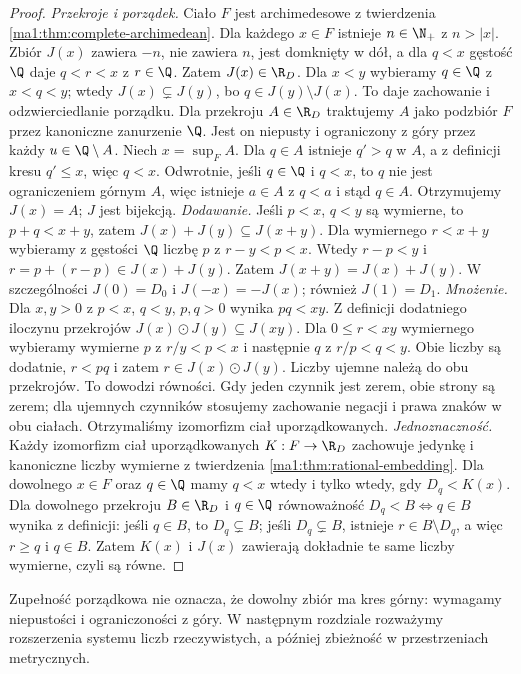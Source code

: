 \begin{proof}
\emph{Przekroje i porządek.} Ciało $F$ jest archimedesowe z twierdzenia \ref{ma1:thm:complete-archimedean}. Dla każdego $x\in F$ istnieje $n\in\N_+$ z $n>|x|$. Zbiór $J(x)$ zawiera $-n$, nie zawiera $n$, jest domknięty w dół, a dla $q<x$ gęstość $\Q$ daje $q<r<x$ z $r\in\Q$. Zatem $J(x)\in\R_D$. Dla $x<y$ wybieramy $q\in\Q$ z $x<q<y$; wtedy $J(x)\subsetneq J(y)$, bo $q\in J(y)\setminus J(x)$. To daje zachowanie i odzwierciedlanie porządku.
Dla przekroju $A\in\R_D$ traktujemy $A$ jako podzbiór $F$ przez kanoniczne zanurzenie $\Q$. Jest on niepusty i ograniczony z góry przez każdy $u\in\Q\setminus A$. Niech $x=\sup_F A$. Dla $q\in A$ istnieje $q'>q$ w $A$, a z definicji kresu $q'\le x$, więc $q<x$. Odwrotnie, jeśli $q\in\Q$ i $q<x$, to $q$ nie jest ograniczeniem górnym $A$, więc istnieje $a\in A$ z $q<a$ i stąd $q\in A$. Otrzymujemy $J(x)=A$; $J$ jest bijekcją.
\emph{Dodawanie.} Jeśli $p<x$, $q<y$ są wymierne, to $p+q<x+y$, zatem $J(x)+J(y)\subseteq J(x+y)$. Dla wymiernego $r<x+y$ wybieramy z gęstości $\Q$ liczbę $p$ z $r-y<p<x$. Wtedy $r-p<y$ i $r=p+(r-p)\in J(x)+J(y)$. Zatem $J(x+y)=J(x)+J(y)$. W szczególności $J(0)=D_0$ i $J(-x)=-J(x)$; również $J(1)=D_1$.
\emph{Mnożenie.} Dla $x,y>0$ z $p<x$, $q<y$, $p,q>0$ wynika $pq<xy$. Z definicji dodatniego iloczynu przekrojów $J(x)\odot J(y)\subseteq J(xy)$. Dla $0\le r<xy$ wymiernego wybieramy wymierne $p$ z $r/y<p<x$ i następnie $q$ z $r/p<q<y$. Obie liczby są dodatnie, $r<pq$ i zatem $r\in J(x)\odot J(y)$. Liczby ujemne należą do obu przekrojów. To dowodzi równości. Gdy jeden czynnik jest zerem, obie strony są zerem; dla ujemnych czynników stosujemy zachowanie negacji i prawa znaków w obu ciałach. Otrzymaliśmy izomorfizm ciał uporządkowanych.
\emph{Jednoznaczność.} Każdy izomorfizm ciał uporządkowanych $K:F\to\R_D$ zachowuje jedynkę i kanoniczne liczby wymierne z twierdzenia \ref{ma1:thm:rational-embedding}. Dla dowolnego $x\in F$ oraz $q\in\Q$ mamy $q<x$ wtedy i tylko wtedy, gdy $D_q<K(x)$. Dla dowolnego przekroju $B\in\R_D$ i $q\in\Q$ równoważność $D_q<B\Leftrightarrow q\in B$ wynika z definicji: jeśli $q\in B$, to $D_q\subsetneq B$; jeśli $D_q\subsetneq B$, istnieje $r\in B\setminus D_q$, a więc $r\ge q$ i $q\in B$. Zatem $K(x)$ i $J(x)$ zawierają dokładnie te same liczby wymierne, czyli są równe.
\end{proof}
\begin{uwaga}
Zupełność porządkowa nie oznacza, że dowolny zbiór ma kres górny: wymagamy niepustości i ograniczoności z góry. W następnym rozdziale rozważymy rozszerzenia systemu liczb rzeczywistych, a później zbieżność w przestrzeniach metrycznych.
\end{uwaga}
